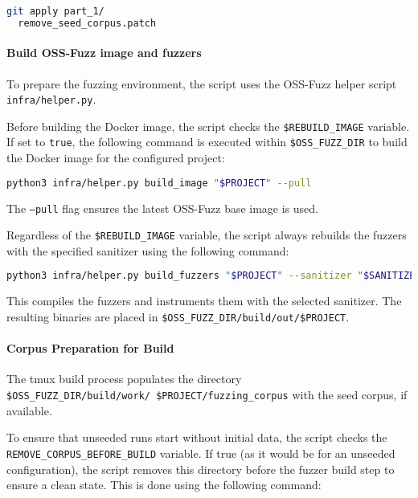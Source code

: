 \documentclass[11pt,a4paper,twocolumn]{article}
\begin{document}
\begin{lstlisting}[language=bash, caption={Bash script to apply the patch to remove the seed corpus from the Docker image and build script}]
git apply part_1/
  remove_seed_corpus.patch
\end{lstlisting}

\noindent \paragraph{Build OSS-Fuzz image and fuzzers} \label{sec:methodology_build} To prepare the fuzzing environment, the script uses the OSS-Fuzz helper script \texttt{infra/helper.py}.

Before building the Docker image, the script checks the \texttt{\$REBUILD\_IMAGE} variable. If set to \texttt{true}, the following command is executed within \texttt{\$OSS\_FUZZ\_DIR} to build the Docker image for the configured project:

\begin{lstlisting}[language=bash, caption={Bash script to build the Docker image for the configured project}]
python3 infra/helper.py build_image "$PROJECT" --pull
\end{lstlisting}
The \texttt{---pull} flag ensures the latest OSS-Fuzz base image is used.

Regardless of the \texttt{\$REBUILD\_IMAGE} variable, the script always rebuilds the fuzzers with the specified sanitizer using the following command:
\begin{lstlisting}[language=bash, caption={OSS-Fuzz helper script command to build the project fuzzers with the specified sanitizer}]
python3 infra/helper.py build_fuzzers "$PROJECT" --sanitizer "$SANITIZER"
\end{lstlisting}
This compiles the fuzzers and instruments them with the selected sanitizer. The resulting binaries are placed in \texttt{\$OSS\_FUZZ\_DIR/build/out/\$PROJECT}.

\noindent \paragraph{Corpus Preparation for Build} \label{sec:methodology_corpus_prep_build} The tmux build process populates the directory \texttt{\$OSS\_FUZZ\_DIR/build/work/\ \$PROJECT/fuzzing\_corpus} with the seed corpus, if available.

To ensure that unseeded runs start without initial data, the script checks the \texttt{REMOVE\_CORPUS\_BEFORE\_BUILD} variable. If true (as it would be for an unseeded configuration), the script removes this directory before the fuzzer build step to ensure a clean state. This is done using the following command:
\end{document}
